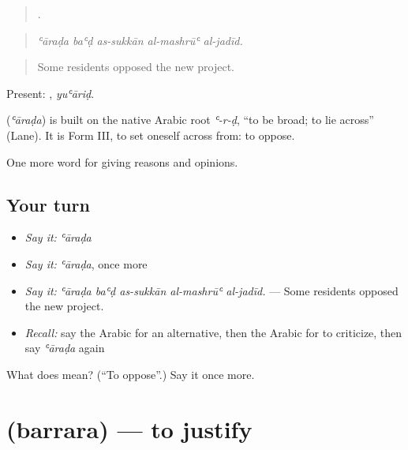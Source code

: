 \begin{quote}
    .
\end{quote}

\begin{quote}
\emph{ʿāraḍa baʿḍ as-sukkān al-mashrūʿ al-jadīd.}
\end{quote}

\begin{quote}
Some residents opposed the new project.
\end{quote}

Present: , \emph{yuʿāriḍ}.

\begin{cousinweb}
\textbf{} (\emph{ʿāraḍa}) is built on the native Arabic root \emph{ʿ-r-ḍ}, \textquotedblleft{}to be broad; to lie across\textquotedblright{} (Lane). It is Form III, to set oneself across from: to oppose.
\end{cousinweb}

\begin{grammarlens}[title={What you've built}]
One more word for giving reasons and opinions.
\end{grammarlens}

\subsection*{Your turn}
\begin{itemize}
\raggedright
  \item \emph{Say it:} \emph{ʿāraḍa}
  \item \emph{Say it:} \emph{ʿāraḍa}, once more
  \item \emph{Say it:} \emph{ʿāraḍa baʿḍ as-sukkān al-mashrūʿ al-jadīd.} — Some residents opposed the new project.
  \item \emph{Recall:} say the Arabic for an alternative, then the Arabic for to criticize, then say \emph{ʿāraḍa} again
\end{itemize}

\begin{tcolorbox}[breakable,colback=teal!4,colframe=teal!35!black,title={Before you move on}]
What does  mean? (\textquotedblleft{}To oppose\textquotedblright{}.) Say it once more.
\end{tcolorbox}
\section[\texorpdfstring{\ar{برر} (barrara)}{برر (barrara)}]{ (barrara) — to justify}

